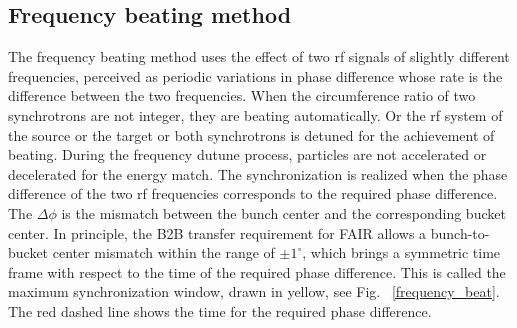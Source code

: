 \subsection{Frequency beating method}
\label{subsec:beating}

The frequency beating method uses the effect of two rf signals of slightly different frequencies, perceived as periodic variations in phase difference whose rate is the difference between the two frequencies. When the circumference ratio of two synchrotrons are not integer, they are beating automatically. Or the rf system of the source or the target or both synchrotrons is detuned for the achievement of beating. During the frequency dutune process, particles are not accelerated or decelerated for the energy match. The synchronization is realized when the phase difference of the two rf frequencies corresponds to the required phase difference. The $\Delta \phi$ is the mismatch between the bunch center and the corresponding bucket center. In principle, the B2B transfer requirement for FAIR allows a bunch-to-bucket center mismatch within the range of $\pm1^\circ$, which brings a symmetric time frame with respect to the time of the required phase difference. This is called the maximum synchronization window, drawn in yellow, see Fig. ~\ref{frequency_beat}. The red dashed line shows the time for the required phase difference.


